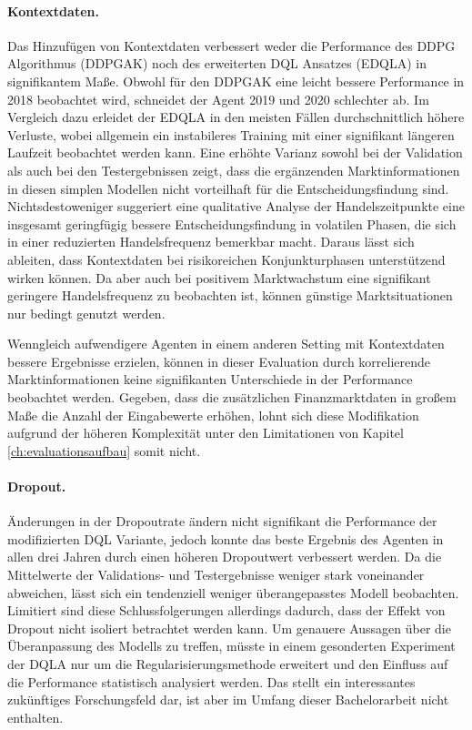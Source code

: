 \paragraph{Kontextdaten.}
Das Hinzufügen von Kontextdaten verbessert weder die Performance des \acs{DDPG} Algorithmus (\acs{DDPGAK}) noch des erweiterten \acs{DQL} Ansatzes (\acs{EDQLA}) in signifikantem Maße.
Obwohl für den \acs{DDPGAK} eine leicht bessere Performance in 2018 beobachtet wird, schneidet der Agent 2019 und 2020 schlechter ab.
Im Vergleich dazu erleidet der \acs{EDQLA} in den meisten Fällen durchschnittlich höhere Verluste, wobei allgemein ein instabileres Training mit einer signifikant längeren Laufzeit beobachtet werden kann.
Eine erhöhte Varianz sowohl bei der Validation als auch bei den Testergebnissen zeigt, dass die ergänzenden Marktinformationen in diesen simplen Modellen nicht vorteilhaft für die Entscheidungsfindung sind. 
Nichtsdestoweniger suggeriert eine qualitative Analyse der Handelszeitpunkte eine insgesamt geringfügig bessere Entscheidungsfindung in volatilen Phasen, die sich in einer reduzierten Handelsfrequenz bemerkbar macht.
Daraus lässt sich ableiten, dass Kontextdaten bei risikoreichen Konjunkturphasen unterstützend wirken können.
Da aber auch bei positivem Marktwachstum eine signifikant geringere Handelsfrequenz zu beobachten ist, können günstige Marktsituationen nur bedingt genutzt werden.

Wenngleich aufwendigere Agenten in einem anderen Setting \parencites{paperrepo2,startrader} mit Kontextdaten bessere Ergebnisse erzielen, 
können in dieser Evaluation durch korrelierende Marktinformationen keine signifikanten Unterschiede in der Performance beobachtet werden.
Gegeben, dass die zusätzlichen Finanzmarktdaten in großem Maße die Anzahl der Eingabewerte erhöhen, lohnt sich diese Modifikation aufgrund der höheren Komplexität unter den Limitationen von Kapitel \ref{ch:evaluationsaufbau} somit nicht.

\paragraph{Dropout.}

Änderungen in der Dropoutrate ändern nicht signifikant die Performance der modifizierten \acs{DQL} Variante, jedoch konnte das beste Ergebnis des Agenten in allen drei Jahren durch einen höheren Dropoutwert verbessert werden.
Da die Mittelwerte der Validations- und Testergebnisse weniger stark voneinander abweichen, lässt sich ein tendenziell weniger überangepasstes Modell beobachten.
Limitiert sind diese Schlussfolgerungen allerdings dadurch, dass der Effekt von Dropout nicht isoliert betrachtet werden kann.
Um genauere Aussagen über die Überanpassung des Modells zu treffen, müsste in einem gesonderten Experiment der \acs{DQLA} nur um die Regularisierungsmethode erweitert und den Einfluss auf die Performance statistisch analysiert werden. 
Das stellt ein interessantes zukünftiges Forschungsfeld dar, ist aber im Umfang dieser Bachelorarbeit nicht enthalten.

